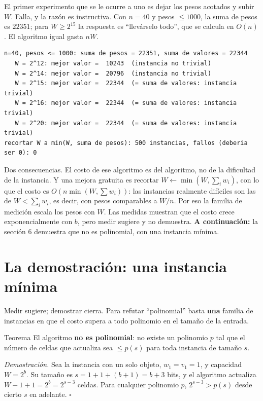 \documentclass[11pt]{article}
\begin{document}
\noindent\begin{minipage}{\linewidth}
El primer experimento que se le ocurre a uno es dejar los pesos acotados y subir $W$. Falla, y la razón es
instructiva. Con $n=40$ y pesos $\le1000$, la suma de pesos es $22351$; para $W\ge2^{15}$ la respuesta es
``llevárselo todo'', que se calcula en $O(n)$. El algoritmo igual gasta $nW$.
\begin{lstlisting}[style=salida,basicstyle=\ttfamily\footnotesize\color{black},columns=fixed]
n=40, pesos <= 1000: suma de pesos = 22351, suma de valores = 22344
   W = 2^12: mejor valor =  10243  (instancia no trivial)
   W = 2^14: mejor valor =  20796  (instancia no trivial)
   W = 2^15: mejor valor =  22344  (= suma de valores: instancia trivial)
   W = 2^16: mejor valor =  22344  (= suma de valores: instancia trivial)
   W = 2^20: mejor valor =  22344  (= suma de valores: instancia trivial)
recortar W a min(W, suma de pesos): 500 instancias, fallos (deberia ser 0): 0
\end{lstlisting}
\end{minipage}
Dos consecuencias. El costo de ese algoritmo es del algoritmo, no de la dificultad de la instancia. Y una
mejora gratuita es recortar $W\leftarrow\min(W,\sum_iw_i)$, con lo que el costo es $O(n\min(W,\sum w_i))$: las
instancias realmente difíciles son las de $W<\sum_iw_i$, es decir, con pesos comparables a $W/n$. Por eso la
familia de medición escala los pesos con $W$. Las medidas muestran que el costo crece exponencialmente con $b$, pero medir sugiere y no demuestra. \textbf{A continuación:} la
sección 6 demuestra que no es polinomial, con una instancia mínima.

\section{La demostración: una instancia mínima}

Medir sugiere; demostrar cierra. Para refutar ``polinomial'' basta \textbf{una} familia de instancias en que el
costo supera a todo polinomio en el tamaño de la entrada.

\begin{resultado}{Teorema}
El algoritmo \textbf{no es polinomial}: no existe un polinomio $p$ tal que el número de celdas que actualiza
sea $\le p(s)$ para toda instancia de tamaño $s$.
\end{resultado}

\textit{Demostración.} Sea la instancia con un solo objeto, $w_1=v_1=1$, y capacidad $W=2^b$. Su tamaño es
$s=1+1+(b+1)=b+3$ bits, y el algoritmo actualiza $W-1+1=2^b=2^{s-3}$ celdas. Para cualquier polinomio $p$,
$2^{s-3}>p(s)$ desde cierto $s$ en adelante. $\square$
\end{document}
